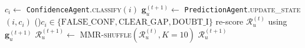 \begin{algorithm}[t]
\DontPrintSemicolon
{}

$c_i \gets$ \texttt{ConfidenceAgent}.\textsc{classify}$(i)$\;
$\mathbf{g}_u^{(t+1)} \gets$
  \texttt{PredictionAgent}.\textsc{update\_state}$(i, c_i)$\;
\If(){$c_i \in \{\text{FALSE\_CONF}, \text{CLEAR\_GAP}, \text{DOUBT\_I}\}$}{
  re-score $\mathcal{R}_u^{(t)}$ using $\mathbf{g}_u^{(t+1)}$\;
  $\mathcal{R}_u^{(t+1)} \gets$ \textsc{MMR-shuffle}$(\mathcal{R}_u^{(t)}, K=10)$\;
}
\Return $\mathcal{R}_u^{(t+1)}$\;
\caption{\texttt{ContinuousPipeline} — per-interaction incremental update; no full agent re-runs.}
\label{alg:continuous}
\end{algorithm}
